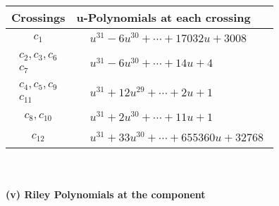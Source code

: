 \documentclass[1p]{elsarticle_modified}
\theoremstyle{definition}
\begin{document}
\begin{tabular}{m{50pt}|m{274pt}}
Crossings & \hspace{64pt}u-Polynomials at each crossing \\
\hline $$\begin{aligned}c_{1}\end{aligned}$$&$\begin{aligned}
&u^{31}-6 u^{30}+\cdots+17032 u+3008
\end{aligned}$\\
\hline $$\begin{aligned}c_{2},c_{3},c_{6}\\c_{7}\end{aligned}$$&$\begin{aligned}
&u^{31}-6 u^{30}+\cdots+14 u+4
\end{aligned}$\\
\hline $$\begin{aligned}c_{4},c_{5},c_{9}\\c_{11}\end{aligned}$$&$\begin{aligned}
&u^{31}+12 u^{29}+\cdots+2 u+1
\end{aligned}$\\
\hline $$\begin{aligned}c_{8},c_{10}\end{aligned}$$&$\begin{aligned}
&u^{31}+2 u^{30}+\cdots+11 u+1
\end{aligned}$\\
\hline $$\begin{aligned}c_{12}\end{aligned}$$&$\begin{aligned}
&u^{31}+33 u^{30}+\cdots+655360 u+32768
\end{aligned}$\\
\hline
\end{tabular}\\~\\
\newpage\renewcommand{\arraystretch}{1}
\flushleft \textbf{(v) Riley Polynomials at the component}\newline \\
\end{document}
